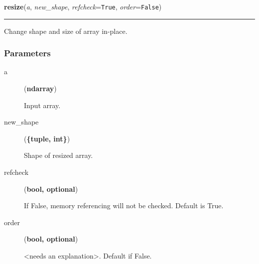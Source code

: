     \label{numpy:ndarray:resize}

    \vspace{0.5ex}

    \begin{boxedminipage}{\textwidth}

    \raggedright \textbf{resize}(\textit{a}, \textit{new\_shape}, \textit{refcheck}=\texttt{True}, \textit{order}=\texttt{False})

    \vspace{-1.5ex}

    \rule{\textwidth}{0.5\fboxrule}

Change shape and size of array in-place.



\hypertarget{parameters}{}
\subsubsection*{Parameters}
\begin{description}
\item[{a}] (\textbf{ndarray})

Input array.

\item[{new{\_}shape}] (\textbf{{\{}tuple, int{\}}})

Shape of resized array.

\item[{refcheck}] (\textbf{bool, optional})

If False, memory referencing will not be checked. Default is True.

\item[{order}] (\textbf{bool, optional})

{\textless}needs an explanation{\textgreater}. Default if False.

\end{description}




\end{boxedminipage}

